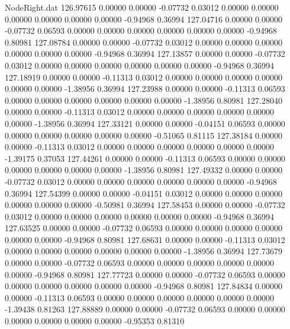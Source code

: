 \begin{filecontents}{NodeRight.dat}
 126.97615    0.00000    0.00000    -0.07732    0.03012    0.00000    0.00000    0.00000    0.00000    0.00000    0.00000   -0.94968    0.36994
 127.04716    0.00000    0.00000    -0.07732    0.06593    0.00000    0.00000    0.00000    0.00000    0.00000    0.00000   -0.94968    0.80981
 127.08784    0.00000    0.00000    -0.07732    0.03012    0.00000    0.00000    0.00000    0.00000    0.00000    0.00000   -0.94968    0.36994
 127.13857    0.00000    0.00000    -0.07732    0.03012    0.00000    0.00000    0.00000    0.00000    0.00000    0.00000   -0.94968    0.36994
 127.18919    0.00000    0.00000    -0.11313    0.03012    0.00000    0.00000    0.00000    0.00000    0.00000    0.00000   -1.38956    0.36994
 127.23988    0.00000    0.00000    -0.11313    0.06593    0.00000    0.00000    0.00000    0.00000    0.00000    0.00000   -1.38956    0.80981
 127.28040    0.00000    0.00000    -0.11313    0.03012    0.00000    0.00000    0.00000    0.00000    0.00000    0.00000   -1.38956    0.36994
 127.33121    0.00000    0.00000    -0.04151    0.06593    0.00000    0.00000    0.00000    0.00000    0.00000    0.00000   -0.51065    0.81115
 127.38184    0.00000    0.00000    -0.11313    0.03012    0.00000    0.00000    0.00000    0.00000    0.00000    0.00000   -1.39175    0.37053
 127.44261    0.00000    0.00000    -0.11313    0.06593    0.00000    0.00000    0.00000    0.00000    0.00000    0.00000   -1.38956    0.80981
 127.49332    0.00000    0.00000    -0.07732    0.03012    0.00000    0.00000    0.00000    0.00000    0.00000    0.00000   -0.94968    0.36994
 127.54399    0.00000    0.00000    -0.04151    0.03012    0.00000    0.00000    0.00000    0.00000    0.00000    0.00000   -0.50981    0.36994
 127.58453    0.00000    0.00000    -0.07732    0.03012    0.00000    0.00000    0.00000    0.00000    0.00000    0.00000   -0.94968    0.36994
 127.63525    0.00000    0.00000    -0.07732    0.06593    0.00000    0.00000    0.00000    0.00000    0.00000    0.00000   -0.94968    0.80981
 127.68631    0.00000    0.00000    -0.11313    0.03012    0.00000    0.00000    0.00000    0.00000    0.00000    0.00000   -1.38956    0.36994
 127.73679    0.00000    0.00000    -0.07732    0.06593    0.00000    0.00000    0.00000    0.00000    0.00000    0.00000   -0.94968    0.80981
 127.77723    0.00000    0.00000    -0.07732    0.06593    0.00000    0.00000    0.00000    0.00000    0.00000    0.00000   -0.94968    0.80981
 127.84834    0.00000    0.00000    -0.11313    0.06593    0.00000    0.00000    0.00000    0.00000    0.00000    0.00000   -1.39438    0.81263
 127.88889    0.00000    0.00000    -0.07732    0.06593    0.00000    0.00000    0.00000    0.00000    0.00000    0.00000   -0.95353    0.81310

\end{filecontents}
